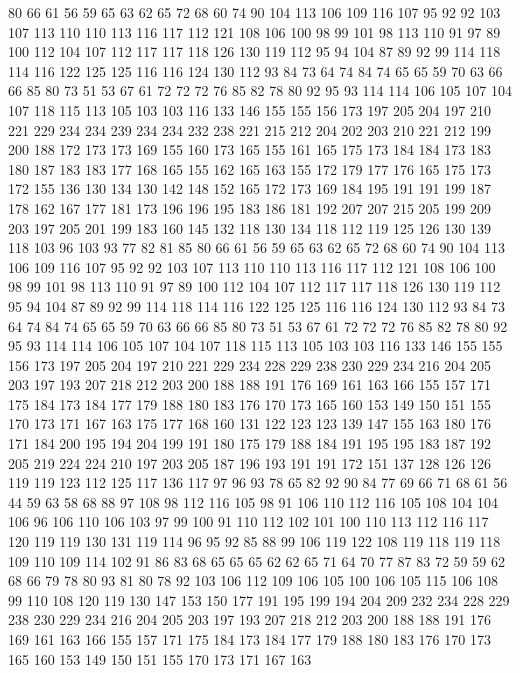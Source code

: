 80 66 61 56 59 65 63 62 65 72 68 60 74 90 104 113 106 109 116 107
95 92 92 103 107 113 110 110 113 116 117 112 121 108 106 100 98 99 101 98
113 110 91 97 89 100 112 104 107 112 117 117 118 126 130 119 112 95 94 104
87 89 92 99 114 118 114 116 122 125 125 116 116 124 130 112 93 84 73 64
74 84 74 65 65 59 70 63 66 66 85 80 73 51 53 67 61 72 72 72
76 85 82 78 80 92 95 93 114 114 106 105 107 104 107 118 115 113 105 103
103 116 133 146 155 155 156 173 197 205 204 197 210 221 229 234 234 239 234 234
232 238 221 215 212 204 202 203 210 221 212 199 200 188 172 173 173 169 155 160
173 165 155 161 165 175 173 184 184 173 183 180 187 183 183 177 168 165 155 162
165 163 155 172 179 177 176 165 175 173 172 155 136 130 134 130 142 148 152 165
172 173 169 184 195 191 191 199 187 178 162 167 177 181 173 196 196 195 183 186
181 192 207 207 215 205 199 209 203 197 205 201 199 183 160 145 132 118 130 134
118 112 119 125 126 130 139 118 103 96 103 93 77 82 81 85 80 66 61 56
59 65 63 62 65 72 68 60 74 90 104 113 106 109 116 107 95 92 92 103
107 113 110 110 113 116 117 112 121 108 106 100 98 99 101 98 113 110 91 97
89 100 112 104 107 112 117 117 118 126 130 119 112 95 94 104 87 89 92 99
114 118 114 116 122 125 125 116 116 124 130 112 93 84 73 64 74 84 74 65
65 59 70 63 66 66 85 80 73 51 53 67 61 72 72 72 76 85 82 78
80 92 95 93 114 114 106 105 107 104 107 118 115 113 105 103 103 116 133 146
155 155 156 173 197 205 204 197 210 221 229 234 228 229 238 230 229 234 216 204
205 203 197 193 207 218 212 203 200 188 188 191 176 169 161 163 166 155 157 171
175 184 173 184 177 179 188 180 183 176 170 173 165 160 153 149 150 151 155 170
173 171 167 163 175 177 168 160 131 122 123 123 139 147 155 163 180 176 171 184
200 195 194 204 199 191 180 175 179 188 184 191 195 195 183 187 192 205 219 224
224 210 197 203 205 187 196 193 191 191 172 151 137 128 126 126 119 119 123 112
125 117 136 117 97 96 93 78 65 82 92 90 84 77 69 66 71 68 61 56
44 59 63 58 68 88 97 108 98 112 116 105 98 91 106 110 112 116 105 108
104 104 106 96 106 110 106 103 97 99 100 91 110 112 102 101 100 110 113 112
116 117 120 119 119 130 131 119 114 96 95 92 85 88 99 106 119 122 108 119
118 119 118 109 110 109 114 102 91 86 83 68 65 65 65 62 62 65 71 64
70 77 87 83 72 59 59 62 68 66 79 78 80 93 81 80 78 92 103 106
112 109 106 105 100 106 105 115 106 108 99 110 108 120 119 130 147 153 150 177
191 195 199 194 204 209 232 234 228 229 238 230 229 234 216 204 205 203 197 193
207 218 212 203 200 188 188 191 176 169 161 163 166 155 157 171 175 184 173 184
177 179 188 180 183 176 170 173 165 160 153 149 150 151 155 170 173 171 167 163
